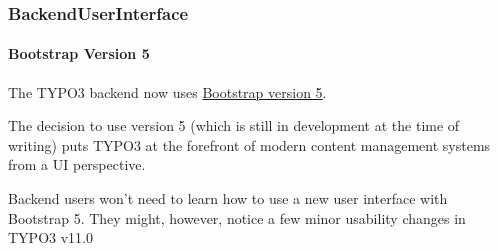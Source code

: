 %

\begin{frame}[fragile]
	\frametitle{BackendUserInterface}
	\framesubtitle{Bootstrap Version 5}

	The TYPO3 backend now uses
	\href{https://getbootstrap.com/}{Bootstrap version 5}.

	\vspace{0.2cm}

	The decision to use version 5 (which is still in development at the time of
	writing) puts TYPO3 at the forefront of modern content management systems
	from a UI perspective.

	\vspace{0.2cm}

	Backend users won't need to learn how to use a new user interface with
	Bootstrap 5. They might, however, notice a few minor usability changes in
	TYPO3 v11.0

\end{frame}

